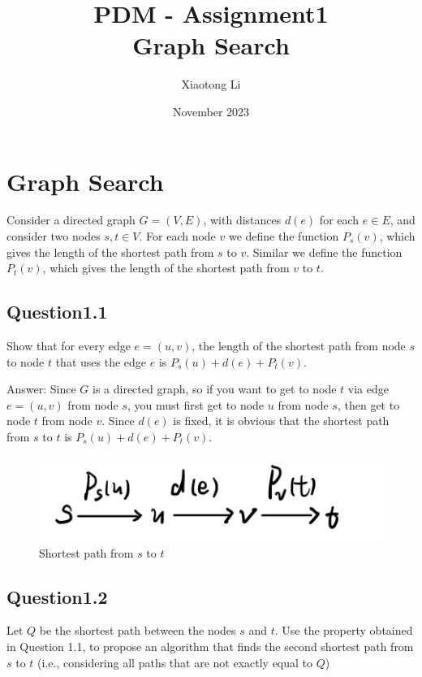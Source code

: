 \documentclass{article}
\title{\textbf{PDM - Assignment1\\}  Graph Search}
\author{Xiaotong Li\qquad 5965373}
\date{November 2023}
\begin{document}
    
    \begin{titlepage}
        \maketitle
    \end{titlepage}
    
    \tableofcontents
    \newpage

    \setlength{\parskip}{1em}
    
    \section{Graph Search}
    Consider a directed graph $G = (V, E)$, with distances $d(e)$ for each $e \in E$, and consider two nodes $s, t \in V$. For each node $v$ we define the function $P_s(v)$, which gives the length of the shortest path from $s$ to $v$. Similar we define the function $P_t(v)$, which gives the length of the shortest path from $v$ to $t$.
        \subsection{Question1.1}
        Show that for every edge $e = (u, v)$, the length of the shortest path from node $s$ to node $t$ that uses the edge $e$ is $P_s(u) + d(e) + P_t(v)$.

        \noindent
        Answer: Since $G$ is a directed graph, so if you want to get to node $t$ via edge $e=(u,v)$ from node $s$, you must first get to node $u$ from node $s$, then get to node $t$ from node $v$. Since $d(e)$ is fixed, it is obvious that the shortest path from $s$ to $t$ is $P_s(u) + d(e) + P_t(v)$.
        \begin{figure}[H]
            \centering
            \includegraphics[width=0.5\linewidth]{img1.jpeg}
            \caption{Shortest path from $s$ to $t$}
            \label{1}
        \end{figure}
        \subsection{Question1.2}
        Let $Q$ be the shortest path between the nodes $s$ and $t$. Use the property obtained in Question 1.1, to propose an algorithm that finds the second shortest path from $s$ to $t$ (i.e., considering all paths that are not exactly equal to $Q$)
\end{document}
